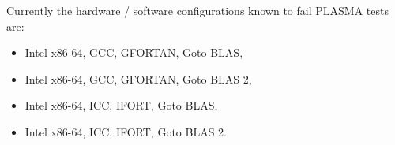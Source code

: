 Currently the hardware / software configurations known to fail PLASMA tests are:
\begin{itemize}
\item Intel x86-64, GCC, GFORTAN, Goto BLAS,
\item Intel x86-64, GCC, GFORTAN, Goto BLAS 2,
\item Intel x86-64, ICC, IFORT, Goto BLAS,
\item Intel x86-64, ICC, IFORT, Goto BLAS 2.
\end{itemize}

